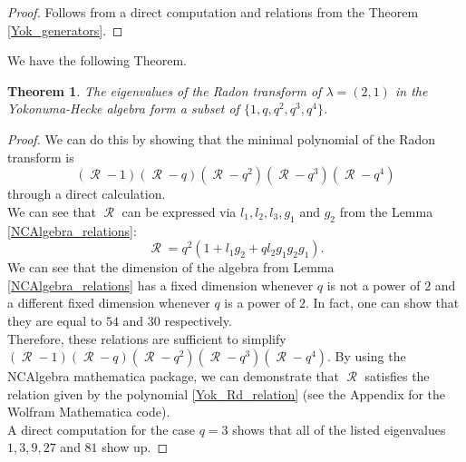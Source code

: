 \documentclass[12pt,reqno]{amsart}
\newtheorem{thm}{Theorem}[section]
\theoremstyle{definition}
\theoremstyle{remark}
\numberwithin{equation}{section}
\DeclareMathOperator{\R}{\mathcal{R}}
\def\IM#1{\textcolor[rgb]{0.00,0.00,0.75}{[I: #1]}}
\begin{document}
\begin{proof}
    Follows from a direct computation and relations from the Theorem \ref{Yok_generators}.
\end{proof}

We have the following Theorem.

\begin{thm}\label{eigenvalues_gl3_Yok}
    The eigenvalues of the Radon transform of $\lambda = (2,1)$ in the Yokonuma-Hecke algebra form a subset of $\{1, q, q^2, q^3,q^4\}$.
\end{thm}

\begin{proof}
    We can do this by showing that the minimal polynomial of the Radon transform is 
    \begin{equation}\label{Yok_Rd_relation}
        (\R - 1)(\R - q)(\R - q^2)(\R - q^3)(\R - q^4)    
    \end{equation}
     through a direct calculation.\\

    We can see that $\R$ can be expressed via $l_1,l_2,l_3,g_1$ and $g_2$ from the Lemma \ref{NCAlgebra_relations}:
    \[
    \R =q^2 (1+l_1g_2+ql_2g_1g_2g_1).
    \]
    We can see that the dimension of the algebra from Lemma \ref{NCAlgebra_relations} has a fixed dimension whenever $q$ is not a power of $2$ and a different fixed dimension whenever $q$ is a power of $2$. In fact, one can show that they are equal to $54$ and $30$ respectively.\\
    
    Therefore, these relations are sufficient to simplify $(\R - 1)(\R - q)(\R - q^2)(\R - q^3)(\R - q^4)$. By using the NCAlgebra mathematica package, we can demonstrate that $\R$ satisfies the relation given by the polynomial \eqref{Yok_Rd_relation} (see the Appendix for the Wolfram Mathematica code).\\ %
    
    A direct computation for the case $q = 3$ shows that all of the listed eigenvalues $1, 3, 9, 27$ and $81$ show up.
\end{proof}
\end{document}
